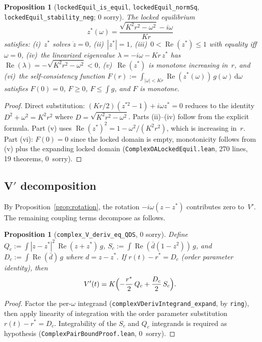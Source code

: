 \documentclass[11pt,a4paper]{article}
\newtheorem{proposition}[theorem]{Proposition}
\theoremstyle{definition}
\DeclareMathOperator{\re}{Re}
\begin{document}
\begin{proposition}[\texttt{lockedEquil\_is\_equil}, \texttt{lockedEquil\_normSq}, \texttt{lockedEquil\_stability\_neg}; 0 sorry]\label{prop:locked-equil}
The locked equilibrium
\[
z^*(\omega) = \frac{\sqrt{K^2r^2 - \omega^2} - i\omega}{Kr}
\]
satisfies: (i)~$z^*$ solves $\dot z = 0$, (ii)~$|z^*| = 1$, (iii)~$0 < \re(z^*) \leq 1$ with equality iff $\omega = 0$, (iv)~the linearized eigenvalue $\lambda = -i\omega - Kr\,z^*$ has $\re(\lambda) = -\sqrt{K^2r^2 - \omega^2} < 0$, (v)~$\re(z^*)$ is monotone increasing in~$r$, and (vi)~the self-consistency function $F(r) := \int_{|\omega|<Kr} \re(z^*(\omega))\,g(\omega)\,\mathrm{d}\omega$ satisfies $F(0) = 0$, $F \geq 0$, $F \leq \int g$, and $F$ is monotone.
\end{proposition}
\begin{proof}
Direct substitution: $(Kr/2)(z^{*2} - 1) + i\omega z^* = 0$ reduces to the identity $D^2 + \omega^2 = K^2r^2$ where $D = \sqrt{K^2r^2-\omega^2}$. Parts (ii)--(iv) follow from the explicit formula. Part (v) uses $\re(z^*)^2 = 1 - \omega^2/(K^2r^2)$, which is increasing in~$r$. Part (vi): $F(0) = 0$ since the locked domain is empty, monotonicity follows from (v) plus the expanding locked domain (\texttt{ComplexOALockedEquil.lean}, 270 lines, 19 theorems, 0~sorry).
\end{proof}

\subsection{V\texorpdfstring{$'$}{\'} decomposition}

By Proposition~\ref{prop:rotation}, the rotation $-i\omega(z-z^*)$ contributes zero to~$V'$. The remaining coupling terms decompose as follows.

\begin{proposition}[\texttt{complex\_V\_deriv\_eq\_QDS}, 0 sorry]\label{prop:v-prime}
Define $Q_c := \int |z-z^*|^2\,\re(z+z^*)\,g$, $S_c := \int \re(\bar d(1-z^2))\,g$, and $D_c := \int \re(\bar d)\,g$ where $d = z - z^*$. If $r(t) - r^* = D_c$ (order parameter identity), then
\[
V'(t) = K\Bigl(-\frac{r^*}{2}\,Q_c + \frac{D_c}{2}\,S_c\Bigr).
\]
\end{proposition}
\begin{proof}
Factor the per-$\omega$ integrand (\texttt{complexVDerivIntegrand\_expand}, by \texttt{ring}), then apply linearity of integration with the order parameter substitution $r(t) - r^* = D_c$. Integrability of the $S_c$ and $Q_c$ integrands is required as hypothesis (\texttt{ComplexPairBoundProof.lean}, 0~sorry).
\end{proof}
\end{document}

